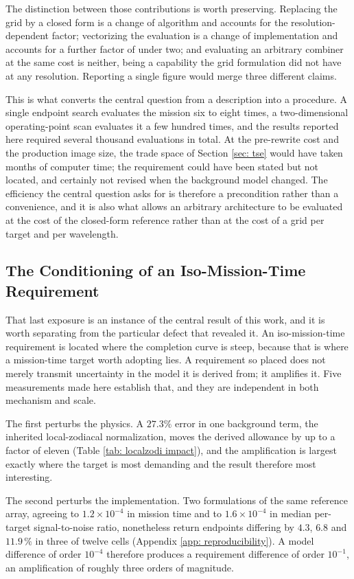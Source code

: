 \documentclass[12pt,a4paper]{article}
\numberwithin{equation}{section}
\numberwithin{figure}{section}
\numberwithin{table}{section}
\begin{document}
The distinction between those contributions is worth preserving. Replacing the grid by a closed form is a change of algorithm and accounts for the resolution-dependent factor; vectorizing the evaluation is a change of implementation and accounts for a further factor of under two; and evaluating an arbitrary combiner at the same cost is neither, being a capability the grid formulation did not have at any resolution. Reporting a single figure would merge three different claims.

This is what converts the central question from a description into a procedure. A single endpoint search evaluates the mission six to eight times, a two-dimensional operating-point scan evaluates it a few hundred times, and the results reported here required several thousand evaluations in total. At the pre-rewrite cost and the production image size, the trade space of Section \ref{sec: tse} would have taken months of computer time; the requirement could have been stated but not located, and certainly not revised when the background model changed. The efficiency the central question asks for is therefore a precondition rather than a convenience, and it is also what allows an arbitrary architecture to be evaluated at the cost of the closed-form reference rather than at the cost of a grid per target and per wavelength.

\subsection{The Conditioning of an Iso-Mission-Time Requirement} \label{sec: discussion: conditioning}
That last exposure is an instance of the central result of this work, and it is worth separating from the particular defect that revealed it. An iso-mission-time requirement is located where the completion curve is steep, because that is where a mission-time target worth adopting lies. A requirement so placed does not merely transmit uncertainty in the model it is derived from; it amplifies it. Five measurements made here establish that, and they are independent in both mechanism and scale.

The first perturbs the physics. A $27.3\%$ error in one background term, the inherited local-zodiacal normalization, moves the derived allowance by up to a factor of eleven (Table \ref{tab: localzodi impact}), and the amplification is largest exactly where the target is most demanding and the result therefore most interesting.

The second perturbs the implementation. Two formulations of the same reference array, agreeing to $1.2\times10^{-4}$ in mission time and to $1.6\times10^{-4}$ in median per-target signal-to-noise ratio, nonetheless return endpoints differing by $4.3$, $6.8$ and $11.9\,\%$ in three of twelve cells (Appendix \ref{app: reproducibility}). A model difference of order $10^{-4}$ therefore produces a requirement difference of order $10^{-1}$, an amplification of roughly three orders of magnitude.
\end{document}
